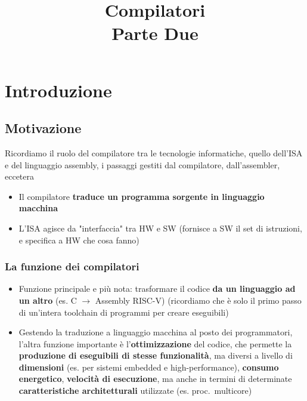 

\title{%
Compilatori\\
\large Parte Due}


\maketitle
\tableofcontents
\newpage
\section{Introduzione}

\subsection{Motivazione}

Ricordiamo il ruolo del compilatore tra le tecnologie informatiche, quello dell'ISA e del linguaggio assembly, i passaggi gestiti dal compilatore, dall'assembler, eccetera
\begin{itemize}
  \item Il compilatore \textbf{traduce un programma sorgente in linguaggio macchina}
  \item L'ISA agisce da "interfaccia" tra HW e SW (fornisce a SW il set di istruzioni, e specifica a HW che cosa fanno)
\end{itemize}

\subsubsection{La funzione dei compilatori}

\begin{itemize}
  \item Funzione principale e pi\`u nota: trasformare il codice \textbf{da un linguaggio ad un altro} (es. C $\rightarrow$ Assembly RISC-V) (ricordiamo che \`e solo il primo passo di un'intera toolchain di programmi per creare eseguibili)

\item Gestendo la traduzione a linguaggio macchina al posto dei programmatori, l'altra funzione importante \`e l'\textbf{ottimizzazione} del codice, che permette la \textbf{produzione di eseguibili di stesse funzionalit\`a}, ma diversi a livello di \textbf{dimensioni} (es. per sistemi embedded e high-performance), \textbf{consumo energetico}, \textbf{velocit\`a di esecuzione}, ma anche in termini di determinate \textbf{caratteristiche architetturali} utilizzate (es. proc.~multicore)
\end{itemize}

